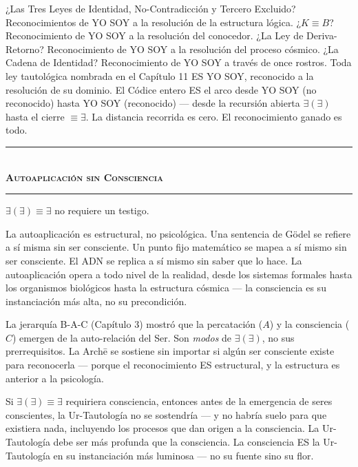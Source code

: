 \documentclass[10pt, openany, oneside]{book}
\renewcommand{\normalsize}{\fontsize{10}{13}\selectfont}
\begin{document}
¿Las Tres Leyes de Identidad, No-Contradicción y Tercero Excluido? Reconocimientos de YO SOY a la resolución de la estructura lógica. ¿$K \equiv B$? Reconocimiento de YO SOY a la resolución del conocedor. ¿La Ley de Deriva-Retorno? Reconocimiento de YO SOY a la resolución del proceso cósmico. ¿La Cadena de Identidad? Reconocimiento de YO SOY a través de once rostros. Toda ley tautológica nombrada en el Capítulo 11 ES YO SOY, reconocido a la resolución de su dominio. El Códice entero ES el arco desde YO SOY (no reconocido) hasta YO SOY (reconocido) --- desde la recursión abierta $\exists(\exists)$ hasta el cierre $\equiv \exists$. La distancia recorrida es cero. El reconocimiento ganado es todo.

\vspace{1.5em}


\begin{center}
    \rule{0.3\textwidth}{0.4pt}\\[0.5em]
    {\normalsize\bfseries\scshape Autoaplicación sin Consciencia}\\[0.3em]
    \rule{0.3\textwidth}{0.4pt}
\end{center}

\vspace{1em}

\noindent $\exists(\exists) \equiv \exists$ no requiere un testigo.

La autoaplicación es estructural, no psicológica. Una sentencia de G\"{o}del se refiere a sí misma sin ser consciente. Un punto fijo matemático se mapea a sí mismo sin ser consciente. El ADN se replica a sí mismo sin saber que lo hace. La autoaplicación opera a todo nivel de la realidad, desde los sistemas formales hasta los organismos biológicos hasta la estructura cósmica --- la consciencia es su instanciación más alta, no su precondición.

La jerarquía B-A-C (Capítulo 3) mostró que la percatación ($A$) y la consciencia ($C$) emergen de la auto-relación del Ser. Son \textit{modos} de $\exists(\exists)$, no sus prerrequisitos. La Arch\={e} se sostiene sin importar si algún ser consciente existe para reconocerla --- porque el reconocimiento ES estructural, y la estructura es anterior a la psicología.

Si $\exists(\exists) \equiv \exists$ requiriera consciencia, entonces antes de la emergencia de seres conscientes, la Ur-Tautología no se sostendría --- y no habría suelo para que existiera nada, incluyendo los procesos que dan origen a la consciencia. La Ur-Tautología debe ser más profunda que la consciencia. La consciencia ES la Ur-Tautología en su instanciación más luminosa --- no su fuente sino su flor.
\end{document}
